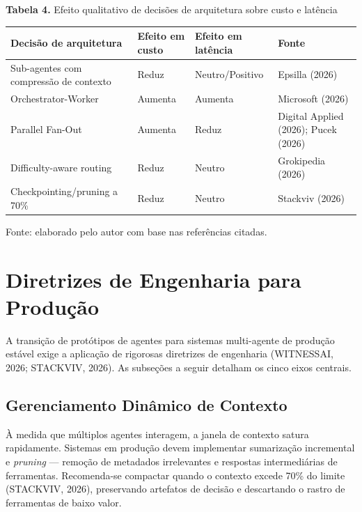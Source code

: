 \documentclass[12pt,a4paper]{article}
\begin{document}
\textbf{Tabela 4.} Efeito qualitativo de decisões de arquitetura sobre custo e latência

\begin{center}
{\small
\setlength{\tabcolsep}{4pt}
\begin{tabularx}{\linewidth}{>{\raggedright\arraybackslash}X>{\centering\arraybackslash}X>{\centering\arraybackslash}X>{\raggedright\arraybackslash}X}
\toprule
\textbf{Decisão de arquitetura} & \textbf{Efeito em custo} & \textbf{Efeito em latência} & \textbf{Fonte} \\
\midrule
Sub-agentes com compressão de contexto & Reduz & Neutro/Positivo & Epsilla (2026) \\
Orchestrator-Worker & Aumenta & Aumenta & Microsoft (2026) \\
Parallel Fan-Out & Aumenta & Reduz & Digital Applied (2026); Pucek (2026) \\
Difficulty-aware routing & Reduz & Neutro & Grokipedia (2026) \\
Checkpointing/pruning a 70\% & Reduz & Neutro & Stackviv (2026) \\
\bottomrule
\end{tabularx}
}
\end{center}

Fonte: elaborado pelo autor com base nas referências citadas.


\section{Diretrizes de Engenharia para Produção}

A transição de protótipos de agentes para sistemas multi-agente de produção estável exige a aplicação de rigorosas diretrizes de engenharia (WITNESSAI, 2026; STACKVIV, 2026). As subseções a seguir detalham os cinco eixos centrais.

\subsection{Gerenciamento Dinâmico de Contexto}

À medida que múltiplos agentes interagem, a janela de contexto satura rapidamente. Sistemas em produção devem implementar sumarização incremental e \textit{pruning} — remoção de metadados irrelevantes e respostas intermediárias de ferramentas. Recomenda-se compactar quando o contexto excede 70\% do limite (STACKVIV, 2026), preservando artefatos de decisão e descartando o rastro de ferramentas de baixo valor.
\end{document}
